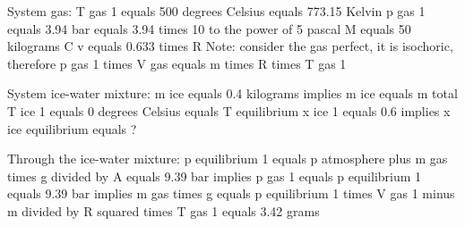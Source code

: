 System gas:
T gas 1 equals 500 degrees Celsius equals 773.15 Kelvin
p gas 1 equals 3.94 bar equals 3.94 times 10 to the power of 5 pascal
M equals 50 kilograms
C v equals 0.633 times R
Note: consider the gas perfect, it is isochoric, therefore
p gas 1 times V gas equals m times R times T gas 1

System ice-water mixture:
m ice equals 0.4 kilograms implies m ice equals m total
T ice 1 equals 0 degrees Celsius equals T equilibrium
x ice 1 equals 0.6 implies x ice equilibrium equals ?

Through the ice-water mixture:
p equilibrium 1 equals p atmosphere plus m gas times g divided by A equals 9.39 bar
implies p gas 1 equals p equilibrium 1 equals 9.39 bar
implies m gas times g equals p equilibrium 1 times V gas 1 minus m divided by R squared times T gas 1 equals 3.42 grams